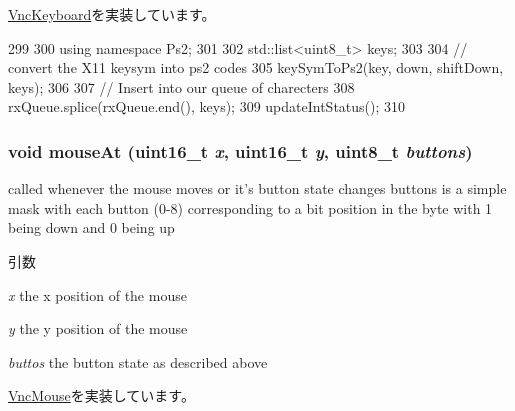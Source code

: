\hyperlink{classVncKeyboard_a5159bd9abc87d9ed9e74c782173e8f0f}{VncKeyboard}を実装しています。


\begin{DoxyCode}
299 {
300     using namespace Ps2;
301 
302     std::list<uint8_t> keys;
303 
304     // convert the X11 keysym into ps2 codes
305     keySymToPs2(key, down, shiftDown, keys);
306 
307     // Insert into our queue of charecters
308     rxQueue.splice(rxQueue.end(), keys);
309     updateIntStatus();
310 }
\end{DoxyCode}
\hypertarget{classPl050_adfccd86af30aeaf063a1700dedde4788}{
\subsubsection[{mouseAt}]{\setlength{\rightskip}{0pt plus 5cm}void mouseAt (uint16\_\-t {\em x}, \/  uint16\_\-t {\em y}, \/  uint8\_\-t {\em buttons})}}
\label{classPl050_adfccd86af30aeaf063a1700dedde4788}
called whenever the mouse moves or it's button state changes buttons is a simple mask with each button (0-\/8) corresponding to a bit position in the byte with 1 being down and 0 being up 
\begin{DoxyParams}{引数}
\item[{\em x}]the x position of the mouse \item[{\em y}]the y position of the mouse \item[{\em buttos}]the button state as described above \end{DoxyParams}


\hyperlink{classVncMouse_a9046dc82e20c004a2ac9b38f47ade145}{VncMouse}を実装しています。


